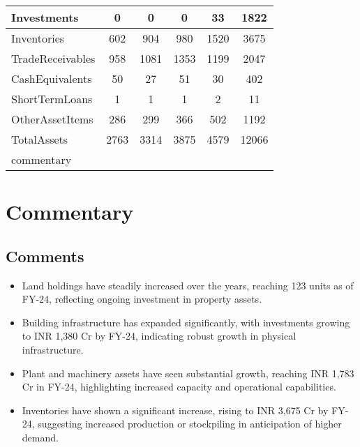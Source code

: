 \documentclass{article}
\begin{document}
\begin{tabularx}{\textwidth}{|X|c|c|c|c|c|}
    Investments &  0 &  0 &  0 &  33 &  1822 &  \\
    \hline
    
    Inventories &  602 &  904 &  980 &  1520 &  3675 &  \\
    \hline
    
    TradeReceivables &  958 &  1081 &  1353 &  1199 &  2047 &  \\
    \hline
    
    CashEquivalents &  50 &  27 &  51 &  30 &  402 &  \\
    \hline
    
    ShortTermLoans &  1 &  1 &  1 &  2 &  11 &  \\
    \hline
    
    OtherAssetItems &  286 &  299 &  366 &  502 &  1192 &  \\
    \hline
    
    TotalAssets &  2763 &  3314 &  3875 &  4579 &  12066 &  \\
    \hline
    
    commentary &  \\
    \hline
    
\end{tabularx}

\section*{Commentary}
\begin{tcolorbox}[colback=white]
\subsection*{Comments}
\begin{itemize}
    \renewcommand\labelitemi{--}
    
    \item Land holdings have steadily increased over the years, reaching 123 units as of FY-24, reflecting ongoing investment in property assets.
    
    \item Building infrastructure has expanded significantly, with investments growing to INR 1,380 Cr by FY-24, indicating robust growth in physical infrastructure.
    
    \item Plant and machinery assets have seen substantial growth, reaching INR 1,783 Cr in FY-24, highlighting increased capacity and operational capabilities.
    
    \item Inventories have shown a significant increase, rising to INR 3,675 Cr by FY-24, suggesting increased production or stockpiling in anticipation of higher demand.
    
\end{itemize}
\end{tcolorbox}
\end{document}
